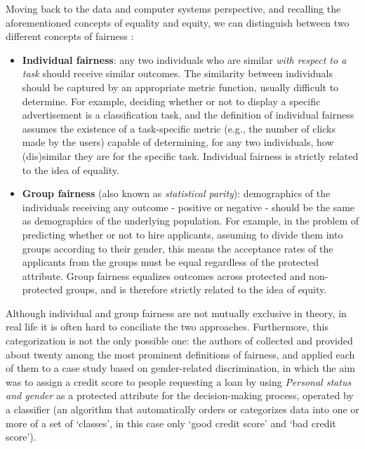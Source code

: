 Moving back to the data and computer systems perspective, and recalling the aforementioned concepts of equality and equity, we can distinguish between two different concepts of fairness \cite{dwork2012fairness}:
\begin{itemize}
\item \textbf{Individual fairness}: any two individuals who are similar \textit{with respect to a task} should receive similar outcomes. The similarity between individuals should be captured by an appropriate metric function, usually difficult to determine. For example, deciding whether or not to display a specific advertisement is a classification task, and the definition of individual fairness assumes the existence of a task-specific metric (e.g., the number of clicks made by the users) capable of determining, for any two individuals, how (dis)similar they are for the specific task. Individual fairness is strictly related to the idea of equality.
\item \textbf{Group fairness} (also known as \textit{statistical parity}): demographics of the individuals receiving any outcome - positive or negative - should be the same as demographics of the underlying population. For example, in the problem of predicting whether or not to hire applicants, assuming to divide them into groups according to their gender, this means the acceptance rates of the applicants from the groups must be equal regardless of the protected attribute. Group fairness equalizes outcomes across protected and non-protected groups, and is therefore strictly related to the idea of equity.
\end{itemize}

Although individual and group fairness are not mutually exclusive in theory, in real life it is often hard to conciliate the two approaches. Furthermore, this categorization is not the only possible one: the authors of \cite{verma2018fairness} collected and provided about twenty among the most prominent definitions of fairness, and applied each of them to a case study based on gender-related discrimination, in which the aim was to assign a credit score to people requesting a loan by using \textit{Personal status and gender} as a protected attribute for the decision-making process, operated by a classifier (an algorithm that automatically orders or categorizes data into one or more of a set of `classes', in this case only `good credit score' and `bad credit score').

